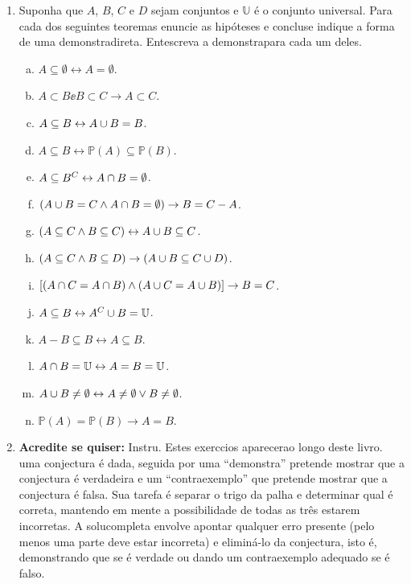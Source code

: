 \begin{enumerate}[{\bf 1.}]
\item \label{conjuntos6} Suponha que $A$, $B$, $C$ e $D$ sejam conjuntos e $\mathbb{U}$ \'e o conjunto universal. Para cada dos seguintes teoremas enuncie as hip\'oteses e conclus\aoi e indique a forma de uma demonstra\cao direta. Ent\ao escreva a demonstra\cao para cada um deles.
\begin{enumerate}[a)]
\item $A\subseteq\emptyset\leftrightarrow A=\emptyset$.
\item $A\subset B\ee B\subset C\to A\subset C$.
\item $A\subseteq B\leftrightarrow A\cup B=B$.
\item $A\subseteq B\leftrightarrow \mathbb{P}(A)\subseteq\mathbb{P}(B)$.
\item $A\subseteq B^C\leftrightarrow A\cap B=\emptyset$.
\item $(A\cup B=C\wedge A\cap B=\emptyset)\to B=C-A$.
\item $(A\subseteq C\wedge B\subseteq C)\leftrightarrow A\cup B\subseteq C$.
\item $(A\subseteq C\wedge B\subseteq D)\to(A\cup B\subseteq C\cup D)$.
\item $[(A\cap C=A\cap B)\wedge(A\cup C=A\cup B)]\to B=C$.
\item $A\subseteq B\leftrightarrow A^C\cup B=\mathbb{U}$.
\item $A-B\subseteq B\leftrightarrow A\subseteq B$.
\item $A\cap B=\mathbb{U}\leftrightarrow A=B=\mathbb{U}$.
\item $A\cup B\neq\emptyset\leftrightarrow A\neq\emptyset \vee B\neq\emptyset $.
\item $\mathbb{P}(A)=\mathbb{P}(B)\to A=B$.
\end{enumerate}

\item {\bf Acredite se quiser:} Instru\cois. Estes exerc\ih cios aparecer\ao ao longo deste livro. uma conjectura \'e dada, seguida por uma ``demonstra\caoi'' pretende mostrar que a conjectura \'e verdadeira e um ``contraexemplo'' que pretende mostrar que a conjectura \'e falsa. Sua tarefa \'e separar o trigo da palha e determinar qual \'e correta, mantendo em mente a possibilidade de todas as tr\^es estarem incorretas. A solu\cao completa envolve apontar qualquer erro presente (pelo menos uma parte deve estar incorreta) e elimin\'a-lo da conjectura, isto \'e, demonstrando que se  \'e verdade ou dando um contraexemplo adequado se \'e falso. 


\end{enumerate}
